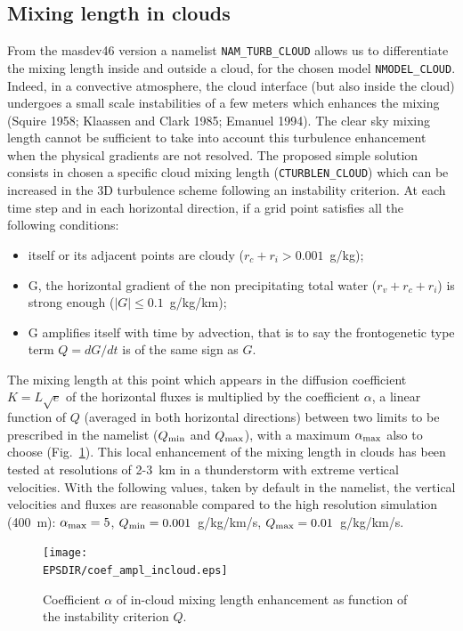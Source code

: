 \subsection{Mixing length in clouds}
From the masdev46 version a namelist {\tt NAM\_TURB\_CLOUD} allows us to differentiate the mixing length inside and outside a cloud, for the chosen model {\tt NMODEL\_CLOUD}.
Indeed, in a convective atmosphere, the cloud interface (but also inside the cloud)  undergoes a small scale instabilities of a few meters which enhances the mixing (Squire 1958; Klaassen and Clark 1985; Emanuel 1994). The clear sky mixing length cannot be sufficient to take into account this turbulence enhancement when the physical gradients are not resolved.
The proposed simple solution consists in chosen a specific cloud mixing length ({\tt CTURBLEN\_CLOUD}) which can be increased in the 3D turbulence scheme following an instability criterion. At each time step and in each horizontal direction, if a grid point satisfies all the following conditions:
\begin{itemize}
\item itself or its adjacent points are cloudy ($r_c+r_i>0.001$~g/kg);
\item G, the horizontal gradient of the non precipitating total water
($r_v+ r_c+r_i$) is strong enough ($|G|\leq 0.1$~g/kg/km);
\item G amplifies itself with time by advection, that is to say the
frontogenetic type term $Q=dG/dt$ is of the same sign as $G$.
\end{itemize}
The mixing length at this point which appears in the diffusion coefficient $K=L\sqrt{e}$ of the horizontal fluxes is multiplied by the coefficient $\alpha$, a linear function of $Q$ (averaged in both horizontal directions) between two limits to be prescribed in the namelist ($Q_{\rm min}$  and $Q_{\rm max}$), with a maximum $\alpha_{\rm max}$ also to choose (Fig.~\ref{coef_ampl_incloud}).
This local enhancement of the mixing length in clouds has been tested at resolutions of 2-3~km in a thunderstorm with extreme vertical velocities. With the following values, taken by default in the namelist, the vertical velocities and fluxes are reasonable compared to the high resolution simulation (400~m): $\alpha_{\rm max}=5$, $Q_{\rm min}=0.001$~g/kg/km/s,  $Q_{\rm max}=0.01$~g/kg/km/s.

\begin{figure}[!ht]
\centerline{\texttt{[image: \\EPSDIR/coef\_ampl\_incloud.eps]}}
\caption{Coefficient $\alpha$ of in-cloud mixing length enhancement as function of the instability criterion $Q$.}
\label{coef_ampl_incloud}
\end{figure}

